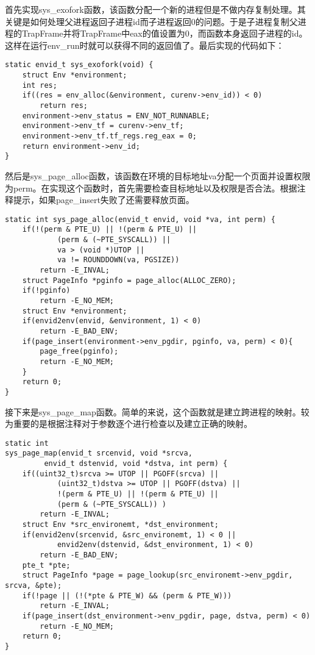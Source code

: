 \begin{exerciseSolution}{7}
    \par 首先实现sys\_exofork函数，该函数分配一个新的进程但是不做内存复制处理。其关键是如何处理父进程返回子进程id而子进程返回0的问题。于是子进程复制父进程的TrapFrame并将TrapFrame中eax的值设置为0，而函数本身返回子进程的id。这样在运行env\_run时就可以获得不同的返回值了。最后实现的代码如下：
    \begin{lstlisting}
static envid_t sys_exofork(void) {
    struct Env *environment;
    int res;
    if((res = env_alloc(&environment, curenv->env_id)) < 0)
        return res;
    environment->env_status = ENV_NOT_RUNNABLE;
    environment->env_tf = curenv->env_tf;
    environment->env_tf.tf_regs.reg_eax = 0;
    return environment->env_id;
}
    \end{lstlisting}

    \par 然后是sys\_page\_alloc函数，该函数在环境的目标地址va分配一个页面并设置权限为perm。在实现这个函数时，首先需要检查目标地址以及权限是否合法。根据注释提示，如果page\_insert失败了还需要释放页面。
    \begin{lstlisting}
static int sys_page_alloc(envid_t envid, void *va, int perm) {
    if(!(perm & PTE_U) || !(perm & PTE_U) ||
            (perm & (~PTE_SYSCALL)) ||
            va > (void *)UTOP ||
            va != ROUNDDOWN(va, PGSIZE))
        return -E_INVAL;
    struct PageInfo *pginfo = page_alloc(ALLOC_ZERO);
    if(!pginfo)
        return -E_NO_MEM;
    struct Env *environment;
    if(envid2env(envid, &environment, 1) < 0)
        return -E_BAD_ENV;
    if(page_insert(environment->env_pgdir, pginfo, va, perm) < 0){
        page_free(pginfo);
        return -E_NO_MEM;
    }
    return 0;
}
    \end{lstlisting}
    \par 接下来是sys\_page\_map函数。简单的来说，这个函数就是建立跨进程的映射。较为重要的是根据注释对于参数逐个进行检查以及建立正确的映射。
    \begin{lstlisting}
static int
sys_page_map(envid_t srcenvid, void *srcva,
         envid_t dstenvid, void *dstva, int perm) {
    if((uint32_t)srcva >= UTOP || PGOFF(srcva) ||
            (uint32_t)dstva >= UTOP || PGOFF(dstva) ||
            !(perm & PTE_U) || !(perm & PTE_U) ||
            (perm & (~PTE_SYSCALL)) )
        return -E_INVAL;
    struct Env *src_environemt, *dst_environment;
    if(envid2env(srcenvid, &src_environemt, 1) < 0 ||
            envid2env(dstenvid, &dst_environment, 1) < 0)
        return -E_BAD_ENV;
    pte_t *pte;
    struct PageInfo *page = page_lookup(src_environemt->env_pgdir, srcva, &pte);
    if(!page || (!(*pte & PTE_W) && (perm & PTE_W)))
        return -E_INVAL;
    if(page_insert(dst_environment->env_pgdir, page, dstva, perm) < 0)
        return -E_NO_MEM;
    return 0;
}
    \end{lstlisting}


\end{exerciseSolution}

